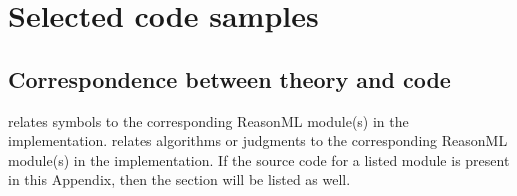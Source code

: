 \chapter{Selected code samples}
\label{app:code-samples}

\newcommand{\cb}[1]{
  \begin{singlespace}
    \inputminted[fontsize=\footnotesize,frame=single]{reasonml}{code/#1}
  \end{singlespace}
  \captionof{listing}{\texttt{#1}}
}

\section{Correspondence between theory and code}
\label{sec:correspondence}

 relates symbols to the corresponding ReasonML module(s) in the implementation.  relates algorithms or judgments to the corresponding ReasonML module(s) in the implementation. If the source code for a listed module is present in this Appendix, then the section will be listed as well.

\begin{table}
  \centering
  \caption{Correspondence between symbols and code}
  \label{tab:correspondence-theory-code}
\end{table}

